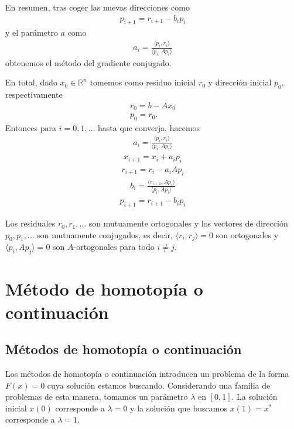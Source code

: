 En resumen, tras coger las nuevas direcciones como
\begin{gather*}p_{i+1}=r_{i+1}-b_ip_i\end{gather*}
y el parámetro $a$ como
\begin{gather*}a_i=\frac{\langle{p_i, r_i\rangle}}{\langle{p_i, Ap_i\rangle}}\end{gather*}
obtenemos el método del gradiente conjugado.

En total, dado $x_0\in\mathbb{R}^n$ tomemos como residuo inicial $r_0$ y dirección inicial $p_0$, respectivamente
\begin{gather*}r_0=b-Ax_0 \\ p_0=r_0.\end{gather*}
Entonces para $i=0, 1, \ldots$ hasta que converja, hacemos
\begin{gather*}a_i=\frac{\langle{p_i, r_i\rangle}}{\langle{p_i, Ap_i\rangle}}\end{gather*}
\begin{gather*}x_{i+1}=x_i+a_ip_i\end{gather*}
\begin{gather*}r_{i+1}=r_i-a_iAp_i\end{gather*}
\begin{gather*}b_i=\frac{\langle{r_{i+1}, Ap_i\rangle}}{\langle{p_i, Ap_i\rangle}}\end{gather*}
\begin{gather*}p_{i+1}=r_{i+1}-b_ip_i\end{gather*}


Los residuales $r_0, r_1, \ldots$ son mutuamente ortogonales y los vectores de dirección $p_0, p_1, \ldots$ son mutuamente conjugados, es decir, $\langle{r_i, r_j\rangle}=0$ son ortogonales y $\langle{p_i, Ap_j\rangle}=0$ son $A$-ortogonales para todo $i\neq j$.

\chapter{Método de homotopía o continuación}

\section{Métodos de homotopía o continuación}

Los métodos de homotopía o continuación introducen un problema de la forma $F(x) = 0$ cuya solución estamos buscando. Considerando una familia de problemas de esta manera, tomamos un parámetro $\lambda$ en $[0,1]$. La solución inicial $x(0)$ corresponde a $\lambda = 0$ y la solución que buscamos $x(1) = x^*$ corresponde a $\lambda = 1$.

